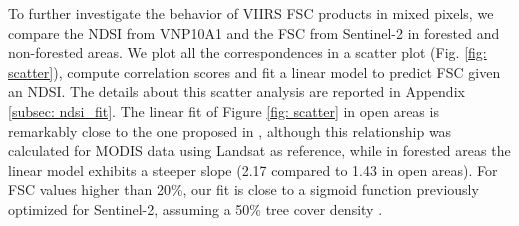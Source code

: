 \documentclass[tc, manuscript]{copernicus}
\begin{document}
To further investigate the behavior of VIIRS FSC products in mixed pixels, we compare the NDSI from VNP10A1 and the FSC from Sentinel-2 in forested and non-forested areas. We plot all the correspondences in a scatter plot (Fig. \ref{fig: scatter}), compute correlation scores and fit a linear model to predict FSC given an NDSI. The details about this scatter analysis are reported in Appendix \ref{subsec: ndsi_fit}. The linear fit of Figure \ref{fig: scatter} in open areas is remarkably close to the one proposed in \citep{salomonson_development_2006}, although this relationship was calculated for MODIS data using Landsat as reference, while in forested areas the linear model exhibits a steeper slope (2.17 compared to 1.43 in open areas). For FSC values higher than 20\%, our fit is close to a sigmoid function previously optimized for Sentinel-2, assuming a 50\% tree cover density \citep{gascoin_estimating_2020}. 
\end{document}
